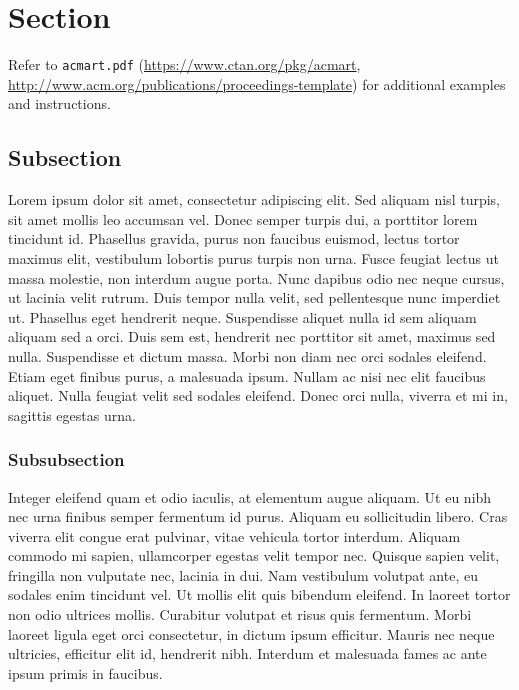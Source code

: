 \documentclass[sigconf]{acmart}
\begin{document}




\maketitle

\section{Section}

Refer to \verb|acmart.pdf| \cite{veytsmanlatex} (\url{https://www.ctan.org/pkg/acmart}, \url{http://www.acm.org/publications/proceedings-template}) for additional examples and instructions.

\subsection{Subsection}

Lorem ipsum dolor sit amet, consectetur adipiscing elit. Sed aliquam nisl turpis, sit amet mollis leo accumsan vel. Donec semper turpis dui, a porttitor lorem tincidunt id. Phasellus gravida, purus non faucibus euismod, lectus tortor maximus elit, vestibulum lobortis purus turpis non urna. Fusce feugiat lectus ut massa molestie, non interdum augue porta. Nunc dapibus odio nec neque cursus, ut lacinia velit rutrum. Duis tempor nulla velit, sed pellentesque nunc imperdiet ut. Phasellus eget hendrerit neque. Suspendisse aliquet nulla id sem aliquam aliquam sed a orci. Duis sem est, hendrerit nec porttitor sit amet, maximus sed nulla. Suspendisse et dictum massa. Morbi non diam nec orci sodales eleifend. Etiam eget finibus purus, a malesuada ipsum. Nullam ac nisi nec elit faucibus aliquet. Nulla feugiat velit sed sodales eleifend. Donec orci nulla, viverra et mi in, sagittis egestas urna.

\subsubsection{Subsubsection}

Integer eleifend quam et odio iaculis, at elementum augue aliquam. Ut eu nibh nec urna finibus semper fermentum id purus. Aliquam eu sollicitudin libero. Cras viverra elit congue erat pulvinar, vitae vehicula tortor interdum. Aliquam commodo mi sapien, ullamcorper egestas velit tempor nec. Quisque sapien velit, fringilla non vulputate nec, lacinia in dui. Nam vestibulum volutpat ante, eu sodales enim tincidunt vel. Ut mollis elit quis bibendum eleifend. In laoreet tortor non odio ultrices mollis. Curabitur volutpat et risus quis fermentum. Morbi laoreet ligula eget orci consectetur, in dictum ipsum efficitur. Mauris nec neque ultricies, efficitur elit id, hendrerit nibh. Interdum et malesuada fames ac ante ipsum primis in faucibus.
\end{document}
